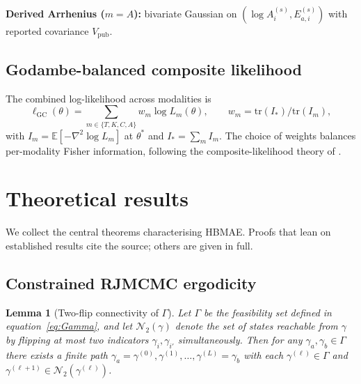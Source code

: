 \documentclass[11pt]{article}
\newtheorem{lemma}[theorem]{Lemma}
\theoremstyle{definition}
\theoremstyle{remark}
\newcommand{\E}{\mathbb{E}}
\newcommand{\HBMAE}{HBMAE\xspace}
\begin{document}
\textbf{Derived Arrhenius ($m=A$):} bivariate Gaussian on $(\log A_i^{(s)},E_{a,i}^{(s)})$
with reported covariance $V_{\mathrm{pub}}$.

\subsection{Godambe-balanced composite likelihood}\label{sec:composite}

The combined log-likelihood across modalities is
\begin{equation}\label{eq:composite}
  \ell_{\mathrm{GC}}(\theta) = \sum_{m\in\{T,K,C,A\}} w_m \log L_m(\theta),\qquad
  w_m = \mathrm{tr}(I_*)/\mathrm{tr}(I_m),
\end{equation}
with $I_m=\E[-\nabla^2\log L_m]$ at $\theta^*$ and $I_*=\sum_m I_m$. The choice of weights
balances per-modality Fisher information, following the composite-likelihood theory of
\citet{Lindsay1988,Varin2011}.

\section{Theoretical results}\label{sec:theory}

We collect the central theorems characterising \HBMAE. Proofs that lean on established
results cite the source; others are given in full.

\subsection{Constrained RJMCMC ergodicity}\label{sec:thm1}

\begin{lemma}[Two-flip connectivity of $\Gamma$]\label{lem:connectivity}
Let $\Gamma$ be the feasibility set defined in equation~\eqref{eq:Gamma}, and let
$\mathcal N_2(\gamma)$ denote the set of states reachable from $\gamma$ by flipping at most
two indicators $\gamma_i,\gamma_{i'}$ simultaneously. Then for any $\gamma_a,\gamma_b\in\Gamma$
there exists a finite path $\gamma_a=\gamma^{(0)},\gamma^{(1)},\dots,\gamma^{(L)}=\gamma_b$
with each $\gamma^{(\ell)}\in\Gamma$ and $\gamma^{(\ell+1)}\in\mathcal N_2(\gamma^{(\ell)})$.
\end{lemma}
\end{document}
